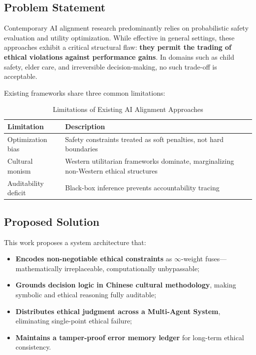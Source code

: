 \documentclass[conference]{IEEEtran}
\begin{document}
\subsection{Problem Statement}

Contemporary AI alignment research predominantly relies
on probabilistic safety evaluation and utility optimization.
While effective in general settings, these approaches exhibit
a critical structural flaw: \textbf{they permit the trading
of ethical violations against performance gains}. In domains
such as child safety, elder care, and irreversible
decision-making, no such trade-off is acceptable.

Existing frameworks share three common limitations:

\begin{table}[!ht]
\caption{Limitations of Existing AI Alignment Approaches}
\label{tab:limitations}
\centering
\renewcommand{\arraystretch}{1.2}
\begin{tabular}{p{3.0cm}p{7.0cm}}
\toprule
\textbf{Limitation} & \textbf{Description} \\
\midrule
Optimization bias & Safety constraints treated as soft
                    penalties, not hard boundaries \\
Cultural monism   & Western utilitarian frameworks dominate,
                    marginalizing non-Western ethical structures \\
Auditability deficit & Black-box inference prevents
                       accountability tracing \\
\bottomrule
\end{tabular}
\end{table}

\subsection{Proposed Solution}

This work proposes a system architecture that:
\begin{itemize}
  \item \textbf{Encodes non-negotiable ethical constraints}
        as $\infty$-weight fuses---mathematically irreplaceable,
        computationally unbypassable;
  \item \textbf{Grounds decision logic in Chinese cultural
        methodology}, making symbolic and ethical reasoning
        fully auditable;
  \item \textbf{Distributes ethical judgment across a
        Multi-Agent System}, eliminating single-point ethical
        failure;
  \item \textbf{Maintains a tamper-proof error memory ledger}
        for long-term ethical consistency.
\end{itemize}
\end{document}
